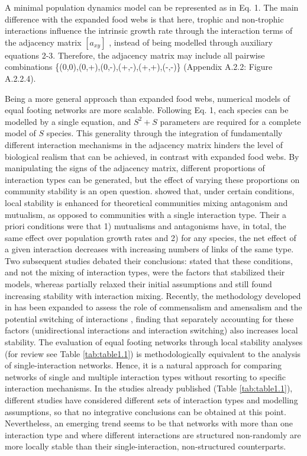 A minimal population dynamics model can be represented as in Eq. 1. The main difference with the expanded food webs is that here, trophic and non-trophic interactions influence the intrinsic growth rate through the interaction terms of the adjacency matrix  $\left[a_{\mathit{xy}}\right]$  , instead of being modelled through auxiliary equations 2-3. Therefore, the adjacency matrix may include all pairwise combinations \{(0,0),(0,+),(0,-),(+,-),(+,+),(-,-)\} (Appendix A.2.2: Figure A.2.2.4).

Being a more general approach than expanded food webs, numerical models of equal footing networks are more scalable. Following Eq. 1, each species can be modelled by a single equation, and  $S^2+S$ parameters are required for a complete model of  $S$ species. This generality through the integration of fundamentally different interaction mechanisms in the adjacency matrix hinders the level of biological realism that can be achieved, in contrast with expanded food webs. By manipulating the signs of the adjacency matrix, different proportions of interaction types can be generated, but the effect of varying these proportions on community stability is an open question. \cite{Mougi2012} showed that, under certain conditions, local stability is enhanced for theoretical communities mixing antagonism and mutualism, as opposed to communities with a single interaction type. Their a priori conditions were that 1) mutualisms and antagonisms have, in total, the same effect over population growth rates and 2) for any species, the net effect of a given interaction decreases with increasing numbers of links of the same type. Two subsequent studies debated their conclusions: \cite{Suweis2014} stated that these conditions, and not the mixing of interaction types, were the factors that stabilized their models, whereas \cite{Kondoh2015} partially relaxed their initial assumptions and still found increasing stability with interaction mixing. Recently, the methodology developed in \cite{Mougi2012} has been expanded to assess the role of commensalism and amensalism \citep{Mougi2016a} and the potential switching of interactions \citep{Mougi2016b}, finding that separately accounting for these factors (unidirectional interactions and interaction switching) also increases local stability. The evaluation of equal footing networks through local stability analyses (for review see Table \ref{tab:table1.1}) is methodologically equivalent to the analysis of single-interaction networks. Hence, it is a natural approach for comparing networks of single and multiple interaction types without resorting to specific interaction mechanisms. In the studies already published (Table \ref{tab:table1.1}), different studies have considered different sets of interaction types and modelling assumptions, so that no integrative conclusions can be obtained at this point. Nevertheless, an emerging trend seems to be that networks with more than one interaction type and where different interactions are structured non-randomly are more locally stable than their single-interaction, non-structured counterparts.

